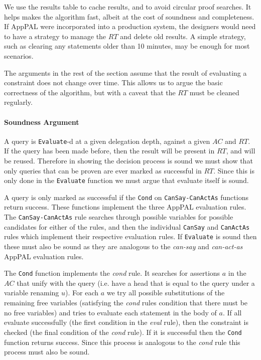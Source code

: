 \documentclass[thesis.tex]{subfiles}
\begin{document}
We use the results table to cache results, and to avoid circular proof searches.
It helps makes the algorithm fast, albeit at the cost of soundness and
completeness. If AppPAL were incorporated into a production system, the
designers would need to have a strategy to manage the $RT$ and delete old
results. A simple strategy, such as clearing any statements older than 10
minutes, may be enough for most scenarios.

The arguments in the rest of the section assume that the result of evaluating a
constraint does not change over time. This allows us to argue the basic
correctness of the algorithm, but with a caveat that the $RT$ must be cleaned
regularly.

\paragraph*{Soundness Argument}
A query is \texttt{Evaluate}-d at a given delegation depth, against a given
$AC$ and $RT$. If the query has been made before,
then the result will be present in $RT$, and will be reused. Therefore in
showing the decision process is sound we must show that only queries that can be
proven are ever marked as successful in $RT$. Since this is only done in the
\texttt{Evaluate} function we must argue that evaluate itself is sound.

A query is only marked as successful if the \texttt{Cond} on
\texttt{CanSay-CanActAs} functions return success. These functions implement the
three AppPAL evaluation rules. The \texttt{CanSay-CanActAs} rule searches
through possible variables for possible candidates for either of the rules, and
then the individual \texttt{CanSay} and \texttt{CanActAs} rules which implement
their respective evaluation rules. If \texttt{Evaluate} is sound then these must
also be sound as they are analogous to the \emph{can-say} and \emph{can-act-as}
AppPAL evaluation rules.

The \texttt{Cond} function implements the \emph{cond} rule. It searches for
assertions $a$ in the $AC$ that unify with the query (i.e. have a head that is
equal to the query under a variable renaming $u$). For each $a$ we try all
possible substitutions of the remaining free variables (satisfying the
\emph{cond} rules condition that there must be no free variables) and tries to
evaluate each statement in the body of $a$. If all evaluate successfully (the
first condition in the \emph{eval} rule), then the constraint is checked (the
final condition of the \emph{cond} rule). If it is successful then the
\texttt{Cond} function returns success. Since this process is analogous to the
\emph{cond} rule this process must also be sound.
\end{document}
